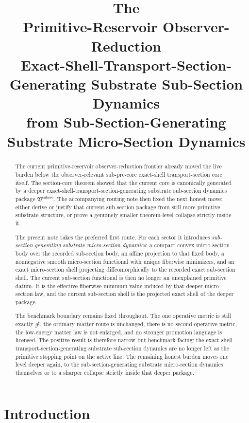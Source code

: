 \documentclass[11pt]{article}
\title{\textbf{The \TheoryName{}}\\[0.4em]
\large Primitive-Reservoir Observer-Reduction\\
\large Exact-Shell-Transport-Section-Generating Substrate Sub-Section Dynamics\\
\large from Sub-Section-Generating Substrate Micro-Section Dynamics}
\author{}
\date{}
\newcommand{\CompletedMetric}{g^{\sharp}}
\newcommand{\SubSectionPackage}{\mathfrak V^{\mathrm{subsec}}}
\begin{document}
\maketitle

\begin{abstract}
The current primitive-reservoir observer-reduction frontier already moved the live burden below the observer-relevant sub-pre-core exact-shell transport-section core itself. The section-core theorem showed that the current core is canonically generated by a deeper exact-shell-transport-section-generating substrate sub-section dynamics package \(\SubSectionPackage\). The accompanying routing note then fixed the next honest move: either derive or justify that current sub-section package from still more primitive substrate structure, or prove a genuinely smaller theorem-level collapse strictly inside it.

The present note takes the preferred first route. For each sector it introduces \emph{sub-section-generating substrate micro-section dynamics}: a compact convex micro-section body over the recorded sub-section body, an affine projection to that fixed body, a nonnegative smooth micro-section functional with unique fiberwise minimizers, and an exact micro-section shell projecting diffeomorphically to the recorded exact sub-section shell. The current sub-section functional is then no longer an unexplained primitive datum. It is the effective fiberwise minimum value induced by that deeper micro-section law, and the current sub-section shell is the projected exact shell of the deeper package.

The benchmark boundary remains fixed throughout. The one operative metric is still exactly \(\CompletedMetric\), the ordinary matter route is unchanged, there is no second operative metric, the low-energy matter law is not enlarged, and no stronger promotion language is licensed. The positive result is therefore narrow but benchmark facing: the exact-shell-transport-section-generating substrate sub-section dynamics are no longer left as the primitive stopping point on the active line. The remaining honest burden moves one level deeper again, to the sub-section-generating substrate micro-section dynamics themselves or to a sharper collapse strictly inside that deeper package.
\end{abstract}

\section{Introduction}
\end{document}

